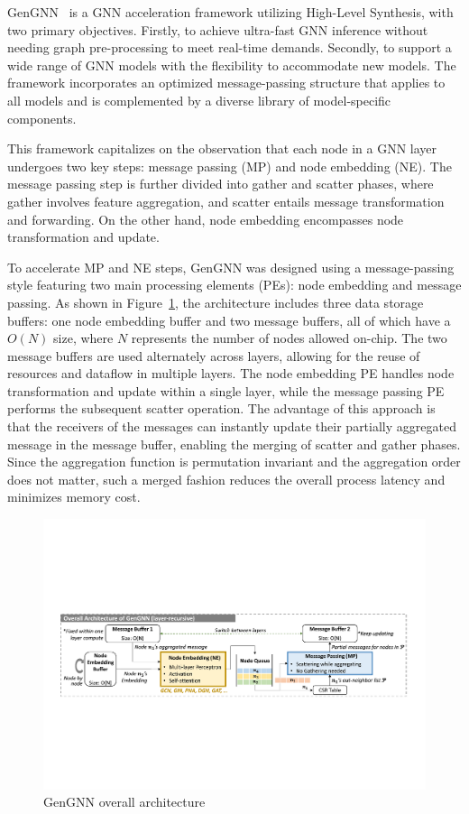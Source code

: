 GenGNN~\cite{DBLP:journals/corr/abs-2201-08475} is a GNN acceleration framework utilizing High-Level Synthesis, with two primary objectives.
Firstly, to achieve ultra-fast GNN inference without needing graph pre-processing to meet real-time demands.
Secondly, to support a wide range of GNN models with the flexibility to accommodate new models.
The framework incorporates an optimized message-passing structure that applies to all models and is complemented by a diverse library of model-specific components.

This framework capitalizes on the observation that each node in a GNN layer undergoes two key steps: message passing (MP) and node embedding (NE). The message passing step is further divided into gather and scatter phases, where gather involves feature aggregation, and scatter entails message transformation and forwarding.
On the other hand, node embedding encompasses node transformation and update.

To accelerate MP and NE steps, GenGNN was designed using a message-passing style featuring two main processing elements (PEs): node embedding and message passing.
As shown in Figure~\ref{fig:gengnn_architecture}, the architecture includes three data storage buffers: one node embedding buffer and two message buffers, all of which have a $O(N)$ size, where $N$ represents the number of nodes allowed on-chip.
The two message buffers are used alternately across layers, allowing for the reuse of resources and dataflow in multiple layers.
The node embedding PE handles node transformation and update within a single layer, while the message passing PE performs the subsequent scatter operation.
The advantage of this approach is that the receivers of the messages can instantly update their partially aggregated message in the message buffer, enabling the merging of scatter and gather phases.
Since the aggregation function is permutation invariant and the aggregation order does not matter, such a merged fashion reduces the overall process latency and minimizes memory cost.

\begin{figure}[t]
    \centering
    \includegraphics[height=0.22\textwidth]{Images/GenGNN_architecture}
    \caption{GenGNN overall architecture~\cite{DBLP:journals/corr/abs-2201-08475}}
    \label{fig:gengnn_architecture}
\end{figure}

